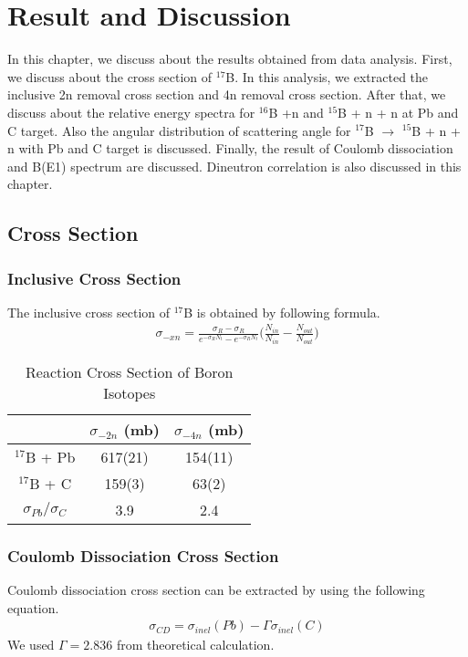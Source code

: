 \chapter{Result and Discussion}
In this chapter, we discuss about the results obtained from data analysis. First, we discuss about the cross section of ${}^{17}$B. In this analysis, we extracted the inclusive 2n removal cross section and 4n removal cross section. After that, we discuss about the relative energy spectra for ${}^{16}$B +n and ${}^{15}$B + n + n at Pb and C target. Also the angular distribution of scattering angle for ${}^{17}$B $\to$ ${}^{15}$B + n + n with Pb and C target is discussed. Finally, the result of Coulomb dissociation and B(E1) spectrum are discussed. Dineutron correlation is also discussed in this chapter.

\section{Cross Section}
\subsection{Inclusive Cross Section}
The inclusive cross section of ${}^{17}$B is obtained by following formula.
\begin{align}
    \sigma_{-xn} = \frac{\sigma_R - \sigma_R}{e^{-\sigma_R N_t} - e^{-\sigma_R N_t}} \bigg( \frac{N_{in}}{N_{in}} - \frac{N_{out}}{N_{out}}\bigg)
\end{align}


\begin{table}[h]
\centering
\begin{tabular}{c|c|c}
    \hline
     & $\sigma_{-2n}$ (mb) & $\sigma_{-4n}$ (mb) \\
    \hline
    $^{17}$B + Pb& 617(21) & 154(11) \\ 
    $^{17}$B + C & 159(3) & 63(2) \\ 
    \hline 
    $\sigma_{Pb}/\sigma_{C}$ & 3.9 & 2.4 \\ 
    \hline
\end{tabular}
\caption{Reaction Cross Section of Boron Isotopes}
\label{tab:Reaction Cross Section of Boron Isotopes}
\end{table}

\subsection{Coulomb Dissociation Cross Section}
Coulomb dissociation cross section can be extracted by using the following equation.
\begin{align}
\sigma_{CD} = \sigma_{inel}(Pb) - \Gamma \sigma_{inel}(C)
\end{align}
We used $\Gamma = 2.836$ from theoretical calculation. \cite{Ogata} 

